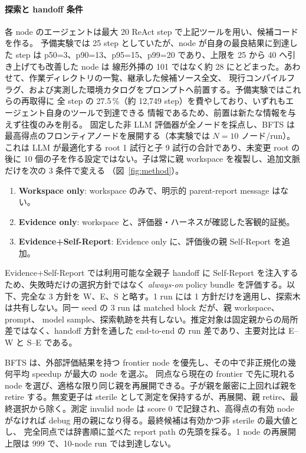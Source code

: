 \documentclass[conference,letterpaper]{IEEEtran}
\newcommand{\armW}{Workspace only}
\newcommand{\armE}{Evidence only}
\newcommand{\armS}{Evidence+Self-Report}
\begin{document}
\paragraph{探索と handoff 条件}
各 node のエージェントは最大 20 ReAct step で上記ツールを用い、候補コードを作る。
予備実験では 25 step としていたが、node が自身の最良結果に到達した step は
p50=3、p90=13、p95=15、p99=20 であり、上限を 25 から 40 へ引き上げても改善した node は
線形外挿の 101 ではなく約 28 にとどまった。あわせて、作業ディレクトリの一覧、継承した候補ソース全文、
現行コンパイルフラグ、および実測した環境カタログをプロンプトへ前置する。予備実験ではこれらの再取得に
全 step の 27.5\,\%（約 12{,}749 step）を費やしており、いずれもエージェント自身のツールで到達できる
情報であるため、前置は新たな情報を与えず往復のみを削る。
固定した非 LLM 評価器が全ノードを採点し、BFTS は最高得点のフロンティアノードを展開する（本実験では
$N=10$ ノード/run）。これは LLM が最適化する root 1 試行と子 9 試行の合計であり、未変更 root の後に
10 個の子を作る設定ではない。子は常に親 workspace を複製し、追加文脈だけを次の 3 条件で変える
（図~\ref{fig:method}）。
\begin{enumerate}
  \item \textbf{\armW}: workspace のみで、明示的 parent-report message はない。
  \item \textbf{\armE}: workspace と、評価器・ハーネスが確認した客観的証拠。
  \item \textbf{\armS}: \armE{} に、評価後の親 Self-Report を追加。
\end{enumerate}
\armS{} では利用可能な全親子 handoff に Self-Report を注入するため、失敗時だけの選択方針ではなく
\emph{always-on} policy bundle を評価する。以下、完全な 3 方針を W、E、S と略す。1 run には
1 方針だけを適用し、探索木は共有しない。同一 seed の 3 run は matched block だが、親 workspace、prompt、
model sample、探索軌跡を共有しない。推定対象は固定親からの局所差ではなく、handoff 方針を通した end-to-end の
run 差であり、主要対比は E--W と S--E である。

BFTS は、外部評価結果を持つ frontier node を優先し、その中で非正規化の幾何平均 speedup が最大の node を選ぶ。
同点なら現在の frontier で先に現れる node を選び、適格な限り同じ親を再展開できる。子が親を厳密に上回れば親を
retire する。無変更子は sterile として測定を保持するが、再展開、親 retire、最終選択から除く。測定 invalid node は
score 0 で記録され、高得点の有効 node がなければ debug 用の親になり得る。最終候補は有効かつ非 sterile の最大値とし、
完全同点では辞書順に並べた report path の先頭を採る。1 node の再展開上限は 999 で、10-node run では到達しない。
\end{document}
